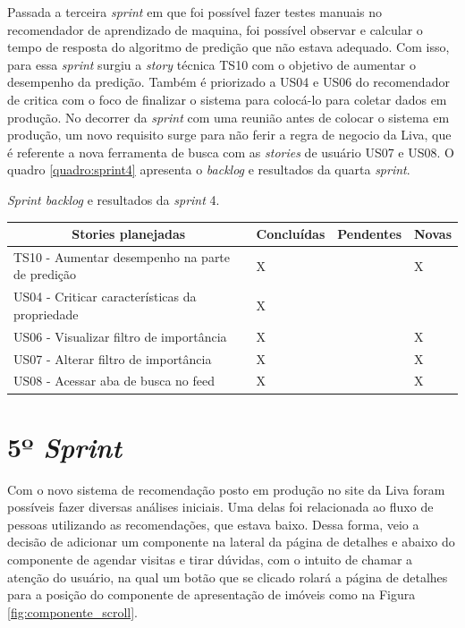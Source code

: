 Passada a terceira \textit{sprint} em que foi possível fazer testes manuais no recomendador de aprendizado de maquina, foi possível observar e calcular o tempo de resposta do algoritmo de predição que não estava adequado. Com isso, para essa \textit{sprint} surgiu a \textit{story} técnica TS10 com o objetivo de aumentar o desempenho da predição. Também é priorizado a US04 e US06 do recomendador de critica com o foco de finalizar o sistema para colocá-lo para coletar dados em produção. No decorrer da \textit{sprint} com uma reunião antes de colocar o sistema em produção, um novo requisito surge para não ferir a regra de negocio da Liva, que é referente a nova ferramenta de busca com as \textit{stories} de usuário US07 e US08.  O quadro \ref{quadro:sprint4} apresenta o \textit{backlog} e resultados da quarta  \textit{sprint}.

\begin{quadro}[H]
\centering
\caption[\textit{Sprint backlog} e resultados da \textit{sprint} 4]{\textit{Sprint backlog} e resultados da \textit{sprint} 4.}
\label{quadro:sprint4}
\begin{tabular}{|p{6cm}|p{2cm}|p{2cm}|p{1cm}|}
\hline
\multicolumn{1}{|c|}{\textbf{Stories planejadas}} & \multicolumn{1}{c|}{\textbf{Concluídas}} & \multicolumn{1}{c|}{\textbf{Pendentes}} & \multicolumn{1}{c|}{\textbf{Novas}} \\ \hline
TS10 - Aumentar desempenho na parte de predição & X &  & X \\ \hline
US04 - Criticar características da propriedade & X &  & \\ \hline
US06 - Visualizar filtro de importância & X &  & X \\ \hline
US07 - Alterar filtro de importância & X &  & X \\ \hline
US08 - Acessar aba de busca no feed & X &  & X \\ \hline
\end{tabular}
\end{quadro}


\section{5º \textit{Sprint}}

Com o novo sistema de recomendação posto em produção no site da Liva foram possíveis fazer diversas análises iniciais. Uma delas foi relacionada ao fluxo de pessoas utilizando as recomendações, que estava baixo. Dessa forma, veio a decisão de adicionar um componente na lateral da página de detalhes e abaixo do componente de agendar visitas e tirar dúvidas, com o intuito de chamar a atenção do usuário, na qual um botão que se clicado rolará a página de detalhes para a posição do componente de apresentação de imóveis como na Figura \ref{fig:componente_scroll}.

